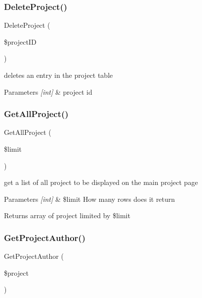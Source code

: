 \subsubsection{\texorpdfstring{Delete\+Project()}{DeleteProject()}}
{\footnotesize\ttfamily Delete\+Project (\begin{DoxyParamCaption}\item[{}]{\$project\+ID }\end{DoxyParamCaption})}



deletes an entry in the project table 


\begin{DoxyParams}{Parameters}
{\em \mbox{[}int\mbox{]}} & project id \\
\hline
\end{DoxyParams}
\mbox{\label{class_project_d_a_o_a66f83737d74fbe61fea6d8eeba29300a}} 
\subsubsection{\texorpdfstring{Get\+All\+Project()}{GetAllProject()}}
{\footnotesize\ttfamily Get\+All\+Project (\begin{DoxyParamCaption}\item[{}]{\$limit }\end{DoxyParamCaption})}



get a list of all project to be displayed on the main project page 


\begin{DoxyParams}{Parameters}
{\em \mbox{[}int\mbox{]}} & \$limit How many rows does it return\\
\hline
\end{DoxyParams}
\begin{DoxyReturn}{Returns}
array of project limited by \$limit 
\end{DoxyReturn}
\mbox{\label{class_project_d_a_o_a2c8979ebd3a03bb6fc406d500cd128ef}} 
\subsubsection{\texorpdfstring{Get\+Project\+Author()}{GetProjectAuthor()}}
{\footnotesize\ttfamily Get\+Project\+Author (\begin{DoxyParamCaption}\item[{}]{\$project }\end{DoxyParamCaption})}



